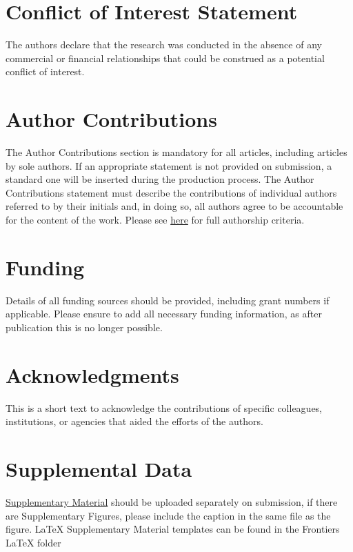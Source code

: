 \documentclass{frontiersSCNS} %
\begin{document}
\section*{Conflict of Interest Statement}

The authors declare that the research was conducted in the absence of any commercial or financial relationships that could be construed as a potential conflict of interest.

\section*{Author Contributions}

The Author Contributions section is mandatory for all articles, including articles by sole authors. If an appropriate statement is not provided on submission, a standard one will be inserted during the production process. The Author Contributions statement must describe the contributions of individual authors referred to by their initials and, in doing so, all authors agree to be accountable for the content of the work. Please see  \href{http://home.frontiersin.org/about/author-guidelines#AuthorandContributors}{here} for full authorship criteria.

\section*{Funding}
Details of all funding sources should be provided, including grant numbers if applicable. Please ensure to add all necessary funding information, as after publication this is no longer possible.

\section*{Acknowledgments}
This is a short text to acknowledge the contributions of specific colleagues, institutions, or agencies that aided the efforts of the authors.

\section*{Supplemental Data}
 \href{http://home.frontiersin.org/about/author-guidelines#SupplementaryMaterial}{Supplementary Material} should be uploaded separately on submission, if there are Supplementary Figures, please include the caption in the same file as the figure. LaTeX Supplementary Material templates can be found in the Frontiers LaTeX folder 
\end{document}

